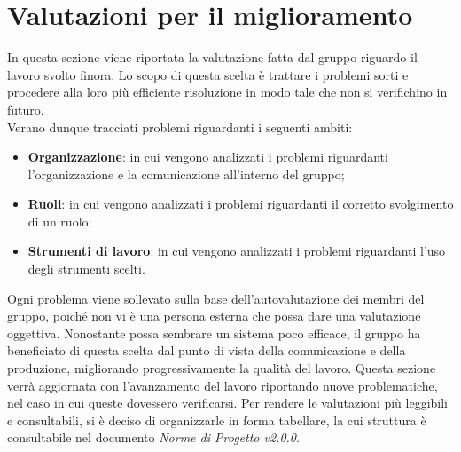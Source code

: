 \section{Valutazioni per il miglioramento}
In questa sezione viene riportata la valutazione fatta dal gruppo riguardo il 
lavoro svolto finora. Lo scopo di questa scelta è trattare i problemi sorti e
procedere alla loro più efficiente risoluzione in modo tale che non si verifichino
in futuro. \\
Verano dunque tracciati problemi riguardanti i seguenti ambiti:

\begin{itemize}
	\item \textbf{Organizzazione}: in cui vengono analizzati i problemi riguardanti 
		l'organizzazione e la comunicazione all'interno del gruppo;
	\item \textbf{Ruoli}: in cui vengono analizzati i problemi riguardanti il 
		corretto svolgimento di un ruolo;
	\item \textbf{Strumenti di lavoro}: in cui vengono analizzati i problemi riguardanti 
		l'uso degli strumenti scelti.
\end{itemize}

\noindent Ogni problema viene sollevato sulla base dell'autovalutazione dei membri del 
gruppo, poiché non vi è una persona esterna che possa dare una valutazione
oggettiva. Nonostante possa sembrare un sistema poco efficace, il gruppo ha 
beneficiato di questa scelta dal punto di vista della comunicazione e della produzione, migliorando progressivamente la qualità del lavoro.
Questa sezione verrà aggiornata con l'avanzamento del lavoro riportando nuove 
problematiche, nel caso in cui queste dovessero verificarsi.
Per rendere le valutazioni più leggibili e consultabili, si è
deciso di organizzarle in forma tabellare, la cui struttura è 
consultabile nel documento \textit{Norme di Progetto v2.0.0}.

